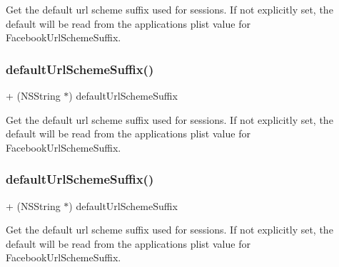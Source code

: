 Get the default url scheme suffix used for sessions. If not explicitly set, the default will be read from the application\textquotesingle{}s plist value for \textquotesingle{}Facebook\+Url\+Scheme\+Suffix\textquotesingle{}. \mbox{\label{interfaceFBSettings_ae7709bddfea2d7cf28ad5e91f769dc9b}} 
\subsubsection{\texorpdfstring{default\+Url\+Scheme\+Suffix()}{defaultUrlSchemeSuffix()}\hspace{0.1cm}{\footnotesize\ttfamily [2/5]}}
{\footnotesize\ttfamily + (N\+S\+String $\ast$) default\+Url\+Scheme\+Suffix \begin{DoxyParamCaption}{ }\end{DoxyParamCaption}}

Get the default url scheme suffix used for sessions. If not explicitly set, the default will be read from the application\textquotesingle{}s plist value for \textquotesingle{}Facebook\+Url\+Scheme\+Suffix\textquotesingle{}. \mbox{\label{interfaceFBSettings_ae7709bddfea2d7cf28ad5e91f769dc9b}} 
\subsubsection{\texorpdfstring{default\+Url\+Scheme\+Suffix()}{defaultUrlSchemeSuffix()}\hspace{0.1cm}{\footnotesize\ttfamily [3/5]}}
{\footnotesize\ttfamily + (N\+S\+String $\ast$) default\+Url\+Scheme\+Suffix \begin{DoxyParamCaption}{ }\end{DoxyParamCaption}}

Get the default url scheme suffix used for sessions. If not explicitly set, the default will be read from the application\textquotesingle{}s plist value for \textquotesingle{}Facebook\+Url\+Scheme\+Suffix\textquotesingle{}. \mbox{\label{interfaceFBSettings_ae7709bddfea2d7cf28ad5e91f769dc9b}} 
